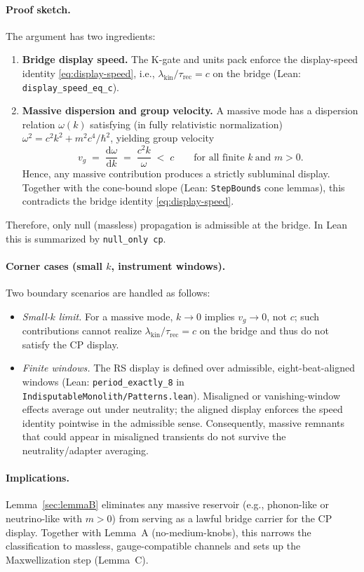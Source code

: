 \documentclass[12pt,a4paper]{article}
\begin{document}
\paragraph{Proof sketch.}
The argument has two ingredients:
\begin{enumerate}
  \item \textbf{Bridge display speed.} The K-gate and units pack enforce the display-speed identity \eqref{eq:display-speed}, i.e., \(\lambda_{\mathrm{kin}}/\tau_{\mathrm{rec}}=c\) on the bridge (Lean: \texttt{display\_speed\_eq\_c}).
  \item \textbf{Massive dispersion and group velocity.} A massive mode has a dispersion relation \(\omega(k)\) satisfying (in fully relativistic normalization) \(\omega^2 = c^2k^2 + m^2 c^4/\hbar^2\), yielding group velocity
  \[
    v_g \;=\; \frac{\mathrm{d}\omega}{\mathrm{d}k} \;=\; \frac{c^2 k}{\omega} \;<\; c
    \qquad \text{for all finite }k\ \text{and }m>0.
  \]
  Hence, any massive contribution produces a strictly subluminal display. Together with the cone-bound slope (Lean: \texttt{StepBounds} cone lemmas), this contradicts the bridge identity \eqref{eq:display-speed}.
\end{enumerate}
Therefore, only null (massless) propagation is admissible at the bridge. In Lean this is summarized by \texttt{null\_only cp}.

\paragraph{Corner cases (small \(k\), instrument windows).}
Two boundary scenarios are handled as follows:
\begin{itemize}
  \item \emph{Small-$k$ limit.} For a massive mode, \(k\to 0\) implies \(v_g\to 0\), not \(c\); such contributions cannot realize \(\lambda_{\mathrm{kin}}/\tau_{\mathrm{rec}}=c\) on the bridge and thus do not satisfy the CP display.
  \item \emph{Finite windows.} The RS display is defined over admissible, eight-beat-aligned windows (Lean: \texttt{period\_exactly\_8} in \texttt{IndisputableMonolith/Patterns.lean}). Misaligned or vanishing-window effects average out under neutrality; the aligned display enforces the speed identity pointwise in the admissible sense. Consequently, massive remnants that could appear in misaligned transients do not survive the neutrality/adapter averaging.
\end{itemize}

\paragraph{Implications.}
Lemma~\ref{sec:lemmaB} eliminates any massive reservoir (e.g., phonon-like or neutrino-like with \(m>0\)) from serving as a lawful bridge carrier for the CP display. Together with Lemma~A (no-medium-knobs), this narrows the classification to massless, gauge-compatible channels and sets up the Maxwellization step (Lemma~C).
\end{document}
